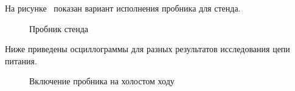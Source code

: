 На рисунке~\label{p:report_powe_probe} показан вариант исполнения пробника для стенда.

\begin{figure}[H]
  \captionsetup{singlelinecheck=true} %
  \caption{Пробник стенда} \label{p:report_powe_probe}
\end{figure}

Ниже приведены осциллограммы для разных результатов исследования цепи питания.

\begin{figure}[H]
  \captionsetup{singlelinecheck=true} %
  \caption{Включение пробника на холостом ходу} \label{p:report_powe_stend_holost_hod}
\end{figure}

